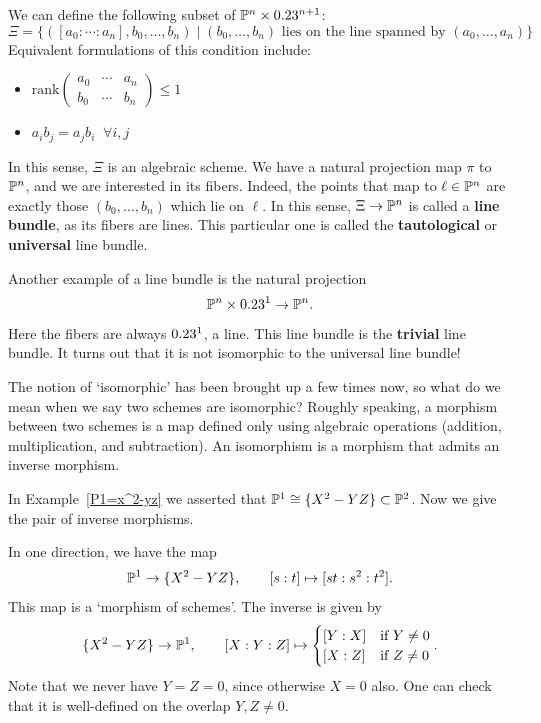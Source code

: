 \begin{example}
    We can define the following subset of $\P^n\times \A^{n+1}$:
    \[
    \Xi = \{([a_0:\cdots:a_n],b_0,\ldots,b_n) \mid (b_0,\ldots,b_n)\text{ lies on the line spanned by }(a_0,\ldots,a_n)\}
    \]
    Equivalent formulations of this condition include:
    \begin{itemize}
        \item $\mathrm{rank}\begin{pmatrix} a_0 &\cdots &a_n \\ b_0 & \cdots & b_n \end{pmatrix}\leq 1$
        \item $a_ib_j=a_jb_i \;\;\forall i,j$
    \end{itemize}
    In this sense, $\Xi$ is an algebraic scheme. We have a natural projection map $\pi$ to $\P^n$, and we are interested in its fibers. Indeed, the points that map to $\ell\in \P^n$ are exactly those $(b_0,\ldots,b_n)$ which lie on $\ell$. In this sense, $\Xi\to \P^n$ is called a \textbf{line bundle}, as its fibers are lines. This particular one is called the \textbf{tautological} or \textbf{universal} line bundle.
    
    Another example of a line bundle is the natural projection
    \[
    \P^n\times \A^1\to\P^n.
    \]
    Here the fibers are always $\A^1$, a line. This line bundle is the \textbf{trivial} line bundle. It turns out that it is not isomorphic to the universal line bundle!
\end{example}
\begin{remark}
  The notion of `isomorphic' has been brought up a few times now, so what do we mean when we say two schemes are isomorphic?
  Roughly speaking, a morphism between two schemes is a map defined only using algebraic operations (addition, multiplication, and subtraction).  An isomorphism is a morphism that admits an inverse morphism.
  \end{remark}
\begin{example}
  In Example~\ref{P1=x^2-yz} we asserted that $\P^1\cong\{X^2-YZ\}\subset\P^2$.
  Now we give the pair of inverse morphisms.

  In one direction, we have the map 
    \[
    \P^1\to \{X^2-YZ\}, \qquad [s:t]\mapsto [st:s^2:t^2].
    \]
    This map is a `morphism of schemes'. The inverse is given by
    \[
    \{X^2-YZ\}\to \P^1, \qquad [X:Y:Z]\mapsto \begin{cases}
        [Y:X] &\text{if }Y\ne0 \\
        [X:Z] &\text{if }Z\ne 0
    \end{cases} .
    \]
    Note that we never have $Y=Z=0$, since otherwise $X=0$ also. One can check that it is well-defined on the overlap $Y,Z\ne0$.
\end{example}
